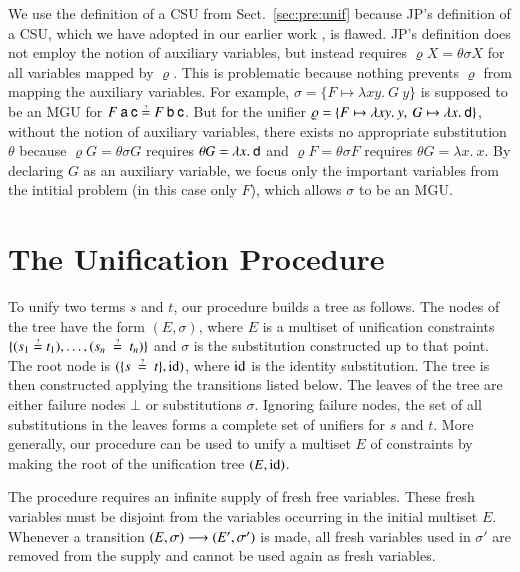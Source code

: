 We use the definition of a CSU from Sect.~\ref{sec:pre:unif} because 
JP's definition of a CSU, which we have adopted in our earlier work \cite{vbn-21-unif}, is flawed.
JP's definition does not employ the notion of auxiliary variables,
but instead requires $\varrho X = \theta\sigma X$ for all variables mapped by $\varrho$.
This is problematic because nothing prevents $\varrho$ from mapping the auxiliary variables.
For example, $\sigma = \{F \mapsto \lambda x y.\> G\>y\}$ is supposed
to be an MGU for $F\>\cst{a}\>\cst{c} \unif F\>\cst{b}\>\cst{c}$.
But for the unifier $\varrho = \{F \mapsto \lambda x y.\> y,\> G \mapsto \lambda x.\> \mathsf{d}\}$,
without the notion of auxiliary variables,
there exists no appropriate substitution $\theta$
because $\varrho G = \theta\sigma G$ requires $\theta G = \lambda x.\> \mathsf{d}$
and $\varrho F = \theta\sigma F$ requires $\theta G = \lambda x.\> x$. By declaring $G$ as an auxiliary variable,
we focus only the important variables from the intitial problem (in this case only $F$),
which allows $\sigma$ to be an MGU.



\section{The Unification Procedure}
\label{sec:unif:the-unification-procedure}

To unify two terms $s$ and $t$, our procedure builds a tree as follows. The
nodes of the tree have the form $(E,\sigma)$, where $E$ is a multiset of
unification constraints $\{(s_1 \unif t_1), \ldots, (s_n~\unif~t_n)\}$ and
$\sigma$ is the substitution constructed up to that point.  The root node is $(\{s~\unif~t\}, \makeop{id})$, where $\operatorname{id}$ is the identity
substitution. The tree is then constructed applying the transitions listed
below. The leaves of the tree are either failure nodes  $\bot$ or substitutions
$\sigma$. Ignoring failure nodes, the set of all substitutions in the leaves
forms a complete set of unifiers for $s$ and $t$. More generally, our procedure can be used to
unify a multiset $E$ of constraints by making the root of the unification tree
$(E, \operatorname{id})$.

The procedure requires an infinite supply of fresh free variables. These fresh
variables must be disjoint from the variables occurring in the initial multiset
$E$. Whenever a transition $(E,\sigma) \longrightarrow (E',\sigma')$ is made, all
fresh variables used in $\sigma'$ are removed from the supply and cannot be used
again as fresh variables.

